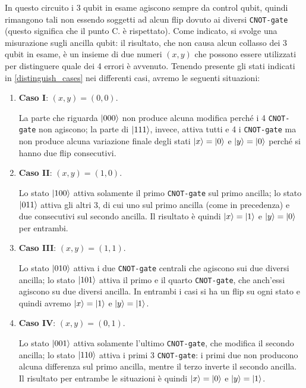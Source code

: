 In questo circuito i 3 qubit in esame agiscono sempre da control qubit, quindi rimangono tali non essendo soggetti ad alcun flip dovuto ai diversi \texttt{CNOT-gate} (questo significa che il punto C. è rispettato). Come indicato, si svolge una misurazione sugli ancilla qubit: il risultato, che non causa alcun collasso dei 3 qubit in esame, è un insieme di due numeri $(x,y)$ che possono essere utilizzati per distinguere quale dei 4 errori è avvenuto. Tenendo presente gli stati indicati in \eqref{distinguish_cases} nei differenti casi, avremo le seguenti situazioni:
\begin{enumerate}
    \item \textbf{Caso I}: $(x,y) = (0,0)$.
    
    \noindent La parte che riguarda $\ket{000}$ non produce alcuna modifica perché i 4 \texttt{CNOT-gate} non agiscono; la parte di $\ket{111}$, invece, attiva tutti e 4 i \texttt{CNOT-gate} ma non produce alcuna variazione finale degli stati $\ket{x} = \ket{0}$ e $\ket{y} = \ket{0}$ perché si hanno due flip consecutivi. 
    
    \item \textbf{Caso II}: $(x,y) = (1,0)$.
    
    \noindent Lo stato $\ket{100}$ attiva solamente il primo \texttt{CNOT-gate} sul primo ancilla; lo stato $\ket{011}$ attiva gli altri 3, di cui uno sul primo ancilla (come in precedenza) e due consecutivi sul secondo ancilla. Il risultato è quindi $\ket{x} = \ket{1}$ e $\ket{y} = \ket{0}$ per entrambi. 
    
    \item \textbf{Caso III}: $(x,y) = (1,1)$. 
    
    \noindent Lo stato $\ket{010}$ attiva i due \texttt{CNOT-gate} centrali che agiscono sui due diversi ancilla; lo stato $\ket{101}$ attiva il primo e il quarto \texttt{CNOT-gate}, che anch'essi agiscono su due diversi ancilla. In entrambi i casi si ha un flip su ogni stato e quindi avremo $\ket{x} = \ket{1}$ e $\ket{y} = \ket{1}$. 
    
    \item \textbf{Caso IV}: $(x,y) = (0,1)$.
    
    \noindent Lo stato $\ket{001}$ attiva solamente l'ultimo \texttt{CNOT-gate}, che modifica il secondo ancilla; lo stato $\ket{110}$ attiva i primi 3 \texttt{CNOT-gate}: i primi due non producono alcuna differenza sul primo ancilla, mentre il terzo inverte il secondo ancilla. Il risultato per entrambe le situazioni è quindi $\ket{x} = \ket{0}$ e $\ket{y} = \ket{1}$. 
\end{enumerate}

